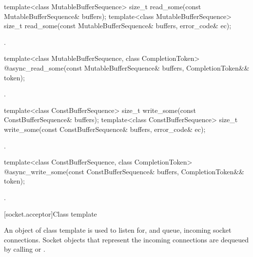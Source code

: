 \begin{itemdecl}
template<class MutableBufferSequence>
  size_t read_some(const MutableBufferSequence& buffers);
template<class MutableBufferSequence>
  size_t read_some(const MutableBufferSequence& buffers,
                   error_code& ec);
\end{itemdecl}

\begin{itemdescr}
\pnum
\returns {}.
\end{itemdescr}

\begin{itemdecl}
template<class MutableBufferSequence, class CompletionToken>
  @\DEDUCED@ async_read_some(const MutableBufferSequence& buffers,
                          CompletionToken&& token);
\end{itemdecl}

\begin{itemdescr}
\pnum
\returns {}.
\end{itemdescr}

\begin{itemdecl}
template<class ConstBufferSequence>
  size_t write_some(const ConstBufferSequence& buffers);
template<class ConstBufferSequence>
  size_t write_some(const ConstBufferSequence& buffers,
                    error_code& ec);
\end{itemdecl}

\begin{itemdescr}
\pnum
\returns {}.
\end{itemdescr}

\begin{itemdecl}
template<class ConstBufferSequence, class CompletionToken>
  @\DEDUCED@ async_write_some(const ConstBufferSequence& buffers,
                           CompletionToken&& token);
\end{itemdecl}

\begin{itemdescr}
\pnum
\returns {}.
\end{itemdescr}




%
[socket.acceptor]{Class template }

\pnum
An object of class template  is used to listen for, and queue, incoming socket connections. Socket objects that represent the incoming connections are dequeued by calling  or .

